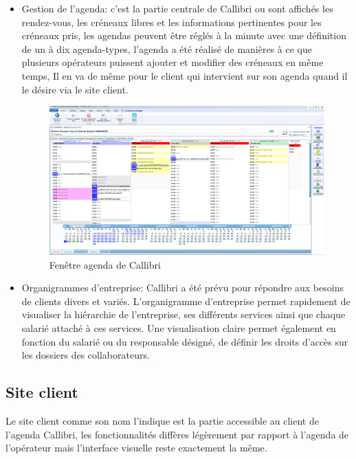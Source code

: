 \begin{itemize}
    \item Gestion de l'agenda: c'est la partie centrale de \gls{Callibri} ou sont affichés les rendez-vous,
    les créneaux libres et les informations pertinentes pour les créneaux pris, les agendas peuvent
    être réglés à la minute avec une définition de un à dix agenda-types, l'agenda a été réalisé 
    de manières à ce que plusieurs opérateurs puissent ajouter et modifier des créneaux en même temps, 
    Il en va de même pour le client qui intervient sur son agenda quand il le désire via le site client.
    \newline
    
    
    \begin{figure}[!h]
        \centering
        \includegraphics[width=1.0\linewidth]{Images/Callibri_agenda_wide}
        \caption{Fenêtre agenda de Callibri}
        \label{fig:callibriagenda}
    \end{figure}
    
    \newpage
    \item Organigrammes d'entreprise: \gls{Callibri} a été prévu pour répondre 
    aux besoins de clients divers et variés. L'organigramme d'entreprise permet rapidement
     de visualiser la hiérarchie de l'entreprise, ses différents services ainsi 
     que chaque salarié attaché à ces services. Une visualisation claire permet également 
     en fonction du salarié ou du responsable désigné, 
     de définir les droits d'accès sur les dossiers des collaborateurs. \newline
\end{itemize}


\subsection{Site client}
Le site client comme son nom l'indique est la partie accessible au client de l'agenda \gls{Callibri},
les fonctionnalités diffères légèrement par rapport à l'agenda de l'opérateur mais l'interface 
visuelle reste exactement la même. \newline

